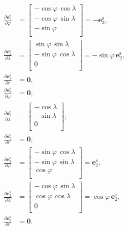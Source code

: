 \documentclass[a4paper,12pt]{book}
\let\vec\mathbf
\begin{document}
\begin{equation}
\label{eq:er_elat_elon_unit_derivatives}
\begin{split}
\frac{\partial \vec e_1^\mathrm{s}}{\partial \varphi} &=
%
\begin{bmatrix}
-\cos\varphi \, \cos\lambda\\
-\cos\varphi \, \sin\lambda\\
-\sin\varphi\\
\end{bmatrix}
%
= -\vec e_3^\mathrm{s}
%
{,}\\
%
\frac{\partial \vec e_1^\mathrm{s}}{\partial \lambda} &=
%
\begin{bmatrix}
 \sin\varphi \, \sin\lambda\\
-\sin\varphi \, \cos\lambda\\
0\\
\end{bmatrix}
%
= -\sin\varphi \, \vec e_2^\mathrm{s}
%
{,}\\
%
\frac{\partial \vec e_1^\mathrm{s}}{\partial r} &= \vec 0{,}\\
%
\frac{\partial \vec e_2^\mathrm{s}}{\partial \varphi} &= \vec 0{,}\\
%
\frac{\partial \vec e_2^\mathrm{s}}{\partial \lambda} &=
%
\begin{bmatrix}
-\cos\lambda\\
-\sin\lambda\\
0\\
\end{bmatrix}
%
{,}\\
%
\frac{\partial \vec e_2^\mathrm{s}}{\partial r} &= \vec 0{,}\\
%
\frac{\partial \vec e_3^\mathrm{s}}{\partial \varphi} &=
%
\begin{bmatrix}
-\sin\varphi \, \cos\lambda\\
-\sin\varphi \, \sin\lambda\\
\cos\varphi\\
\end{bmatrix}
%
= \vec e_1^\mathrm{s}
%
{,}\\
%
\frac{\partial \vec e_3^\mathrm{s}}{\partial \lambda} &=
%
\begin{bmatrix}
-\cos\varphi \, \sin\lambda\\
 \cos\varphi \, \cos\lambda\\
0\\
\end{bmatrix}
%
= \cos\varphi \, \vec e_2^\mathrm{s}
%
{,}\\
%
\frac{\partial \vec e_3^\mathrm{s}}{\partial r} &= \vec 0{.}
\end{split}
\end{equation}
\end{document}
